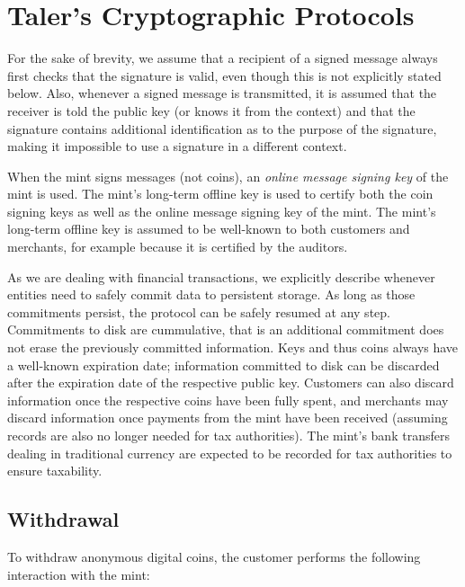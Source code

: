 \documentclass{llncs}
\begin{document}
\section{Taler's Cryptographic Protocols}


For the sake of brevity, we assume that a recipient of a signed
message always first checks that the signature is valid, even though
this is not explicitly stated below.  Also, whenever a signed message
is transmitted, it is assumed that the receiver is told the public key
(or knows it from the context) and that the signature contains
additional identification as to the purpose of the signature, making
it impossible to use a signature in a different context.

When the mint signs messages (not coins), an {\em online message
  signing key} of the mint is used.  The mint's long-term offline key
is used to certify both the coin signing keys as well as the online
message signing key of the mint.  The mint's long-term offline key is
assumed to be well-known to both customers and merchants, for example
because it is certified by the auditors.

As we are dealing with financial transactions, we explicitly describe
whenever entities need to safely commit data to persistent storage.
As long as those commitments persist, the protocol can be safely
resumed at any step.  Commitments to disk are cummulative, that is an
additional commitment does not erase the previously committed
information.  Keys and thus coins always have a well-known expiration
date; information committed to disk can be discarded after the
expiration date of the respective public key.  Customers can also
discard information once the respective coins have been fully spent,
and merchants may discard information once payments from the mint have
been received (assuming records are also no longer needed for tax
authorities).  The mint's bank transfers dealing in traditional
currency are expected to be recorded for tax authorities to ensure
taxability.

\subsection{Withdrawal}

To withdraw anonymous digital coins, the customer performs the
following interaction with the mint:
\end{document}
